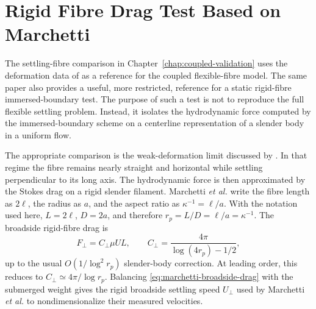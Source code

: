 \section{Rigid Fibre Drag Test Based on Marchetti}
\label{sec:marchetti-rigid-fibre-drag}

The settling-fibre comparison in Chapter~\ref{chap:coupled-validation} uses
the deformation data of \textcite{marchetti_deformation_2018} as a reference
for the coupled flexible-fibre model. The same paper also provides a useful,
more restricted, reference for a static rigid-fibre immersed-boundary test. The
purpose of such a test is not to reproduce the full flexible settling problem.
Instead, it isolates the hydrodynamic force computed by the immersed-boundary
scheme on a centerline representation of a slender body in a uniform flow.

The appropriate comparison is the weak-deformation limit discussed by
\textcite{marchetti_deformation_2018}. In that regime the fibre remains nearly
straight and horizontal while settling perpendicular to its long axis. The
hydrodynamic force is then approximated by the Stokes drag on a rigid slender
filament. Marchetti \emph{et al.} write the fibre length as \(2\ell\), the
radius as \(a\), and the aspect ratio as \(\kappa^{-1}=\ell/a\). With the
notation used here, \(L=2\ell\), \(D=2a\), and therefore
\(r_p=L/D=\ell/a=\kappa^{-1}\). The broadside rigid-fibre drag is
\begin{equation}
    F_{\perp}
    =
    C_{\perp}\mu U L,
    \qquad
    C_{\perp}
    =
    \frac{4\pi}{\log(4r_p)-1/2},
    \label{eq:marchetti-broadside-drag}
\end{equation}
up to the usual \(O(1/\log^2 r_p)\) slender-body correction. At leading order,
this reduces to \(C_{\perp}\simeq 4\pi/\log r_p\). Balancing
\eqref{eq:marchetti-broadside-drag} with the submerged weight gives the rigid
broadside settling speed \(U_{\perp}\) used by Marchetti \emph{et al.} to
nondimensionalize their measured velocities.

